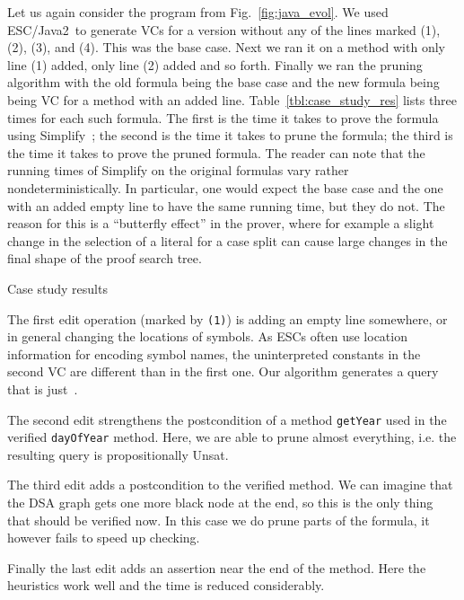 \documentclass{llncs}
\def\lstinlinen{\lstinline[basicstyle=\normalsize\sffamily]}
\def\unsat{{\sc Unsat}}
\def\escjava{\hskip 0pt\hbox{ESC/Java2}}
\begin{document}
Let us again consider the program from Fig.~\ref{fig:java_evol}.
We used \escjava\ to generate VCs for a version without any of the 
lines marked (1), (2), (3), and (4). This was the base case. Next 
we ran it on a method with only line (1) added, only line (2) added 
and so forth. Finally
we ran the pruning algorithm with the old formula being the base
case and the new formula being being VC for a method with an added line.
Table~\ref{tbl:case_study_res} lists three times for each such
formula. The first is the time it takes to prove the formula
using Simplify~\cite{simplify}; the second is the time it takes
to prune the formula; the third is the time it takes to prove
the pruned formula. The reader can note that the running times of 
Simplify on the original formulas vary rather nondeterministically.
In particular, one would expect the base case and the one with
an added empty line to have the same running time, but they do not.
The reason for this is a ``butterfly effect'' in the prover, where for
example a slight change in the selection of a literal for a case split
can cause large changes in the final shape of the proof search tree.

\begin{table}
\centering

  \caption{Case study results}
  \label{tbl:case_study_res}
\end{table}

The first edit operation (marked by \lstinlinen|(1)|) is adding an empty
line somewhere, or in general changing the locations of symbols.
As ESCs often use location information for encoding symbol
names, the uninterpreted constants in the second VC are different
than in the first one. Our algorithm generates a query that is 
just~.

The second edit strengthens the postcondition
of a method \lstinlinen|getYear| used in the verified
\lstinlinen|dayOfYear| method. Here, we are able to prune 
almost everything, i.e. the resulting query is propositionally 
\unsat.

The third edit adds a postcondition to the verified method.
We can imagine that the DSA graph gets one more black node
at the end, so this is the only thing that should be verified
now. In this case we do prune parts of the formula, it however
fails to speed up checking.

Finally the last edit adds an assertion near the end of the method.
Here the heuristics work well and the time is reduced considerably.
\end{document}
